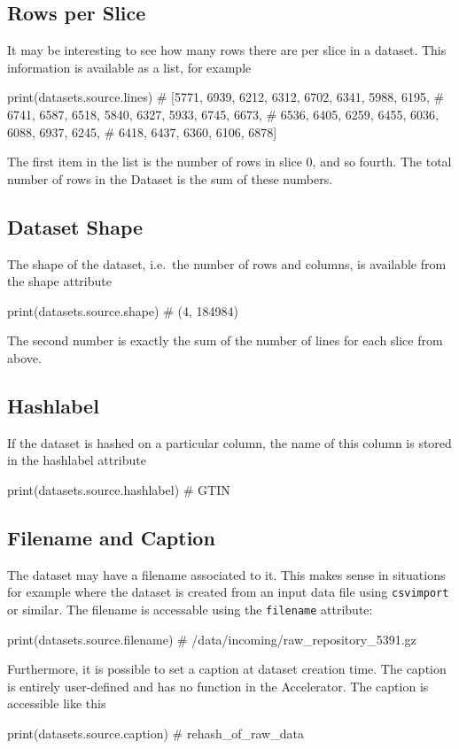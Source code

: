 \subsection*{Rows per Slice}

It may be interesting to see how many rows there are per slice in a
dataset.  This information is available as a list, for example
\begin{python}
print(datasets.source.lines)
# [5771, 6939, 6212, 6312, 6702, 6341, 5988, 6195,
#  6741, 6587, 6518, 5840, 6327, 5933, 6745, 6673,
#  6536, 6405, 6259, 6455, 6036, 6088, 6937, 6245,
#  6418, 6437, 6360, 6106, 6878]
\end{python}
The first item in the list is the number of rows in slice 0, and so
fourth.  The total number of rows in the Dataset is the sum of these
numbers.


\subsection*{Dataset Shape}
The shape of the dataset, i.e.\ the number of rows and columns, is
available from the shape attribute
\begin{python}
print(datasets.source.shape)
# (4, 184984)
\end{python}
The second number is exactly the sum of the number of lines for each
slice from above.


\subsection*{Hashlabel}
If the dataset is hashed on a particular column, the name of this
column is stored in the hashlabel attribute
\begin{python}
print(datasets.source.hashlabel)
# GTIN
\end{python}



\subsection*{Filename and Caption}
The dataset may have a filename associated to it.  This makes sense in
situations for example where the dataset is created from an input data
file using \texttt{csvimport} or similar.  The filename is accessable
using the \texttt{filename} attribute:
\begin{python}
print(datasets.source.filename)
# /data/incoming/raw_repository_5391.gz
\end{python}
Furthermore, it is possible to set a caption at dataset creation time.
The caption is entirely user-defined and has no function in the
Accelerator.  The caption is accessible like this
\begin{python}
print(datasets.source.caption)
# rehash_of_raw_data
\end{python}




